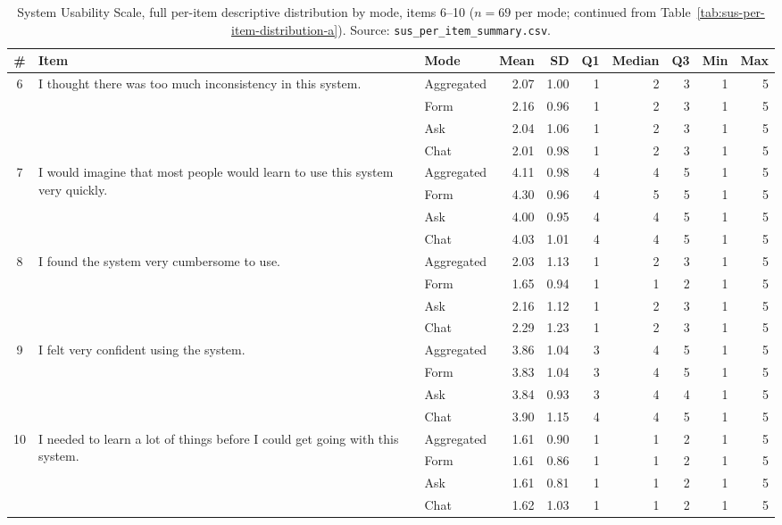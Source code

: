 \begin{table}
\centering
\footnotesize
\begin{tabularx}{\textheight}{@{}c X l r r r r r r r@{}}
\toprule
\# & Item & Mode & Mean & SD & Q1 & Median & Q3 & Min & Max \\
\midrule
\multirow{4}{*}{6}  & \multirow{4}{*}{I thought there was too much inconsistency in this system.}
                    & Aggregated  & 2.07 & 1.00 & 1 & 2 & 3 & 1 & 5 \\
                    & & Form & 2.16 & 0.96 & 1 & 2 & 3 & 1 & 5 \\
                    & & Ask  & 2.04 & 1.06 & 1 & 2 & 3 & 1 & 5 \\
                    & & Chat & 2.01 & 0.98 & 1 & 2 & 3 & 1 & 5 \\
\midrule
\multirow{4}{*}{7}  & \multirow{4}{=}{I would imagine that most people would learn to use this system very quickly.}
                    & Aggregated  & 4.11 & 0.98 & 4 & 4 & 5 & 1 & 5 \\
                    & & Form & 4.30 & 0.96 & 4 & 5 & 5 & 1 & 5 \\
                    & & Ask  & 4.00 & 0.95 & 4 & 4 & 5 & 1 & 5 \\
                    & & Chat & 4.03 & 1.01 & 4 & 4 & 5 & 1 & 5 \\
\midrule
\multirow{4}{*}{8}  & \multirow{4}{*}{I found the system very cumbersome to use.}
                    & Aggregated  & 2.03 & 1.13 & 1 & 2 & 3 & 1 & 5 \\
                    & & Form & 1.65 & 0.94 & 1 & 1 & 2 & 1 & 5 \\
                    & & Ask  & 2.16 & 1.12 & 1 & 2 & 3 & 1 & 5 \\
                    & & Chat & 2.29 & 1.23 & 1 & 2 & 3 & 1 & 5 \\
\midrule
\multirow{4}{*}{9}  & \multirow{4}{*}{I felt very confident using the system.}
                    & Aggregated  & 3.86 & 1.04 & 3 & 4 & 5 & 1 & 5 \\
                    & & Form & 3.83 & 1.04 & 3 & 4 & 5 & 1 & 5 \\
                    & & Ask  & 3.84 & 0.93 & 3 & 4 & 4 & 1 & 5 \\
                    & & Chat & 3.90 & 1.15 & 4 & 4 & 5 & 1 & 5 \\
\midrule
\multirow{4}{*}{10} & \multirow{4}{=}{I needed to learn a lot of things before I could get going with this system.}
                    & Aggregated  & 1.61 & 0.90 & 1 & 1 & 2 & 1 & 5 \\
                    & & Form & 1.61 & 0.86 & 1 & 1 & 2 & 1 & 5 \\
                    & & Ask  & 1.61 & 0.81 & 1 & 1 & 2 & 1 & 5 \\
                    & & Chat & 1.62 & 1.03 & 1 & 1 & 2 & 1 & 5 \\
\bottomrule
\end{tabularx}
\caption{System Usability Scale, full per-item descriptive
distribution by mode, items 6--10 ($n = 69$ per mode; continued
from Table~\ref{tab:sus-per-item-distribution-a}). Source:
\texttt{sus\_per\_item\_summary.csv}.}
\label{tab:sus-per-item-distribution-b}
\end{table}
